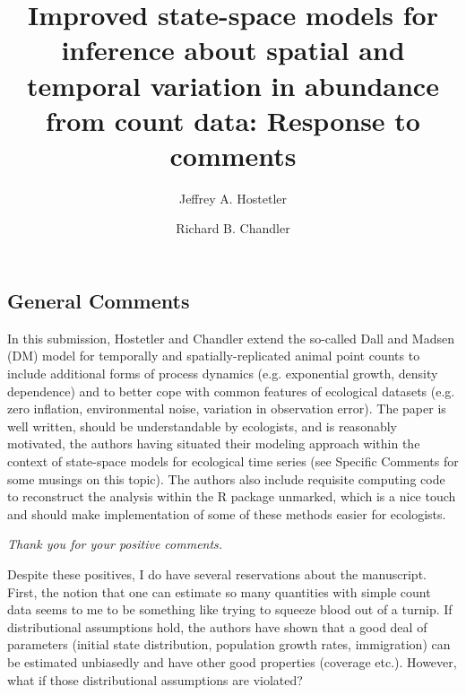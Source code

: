 \documentclass[12pt,english]{article}
\title{Improved state-space models for inference about 
spatial and temporal variation in abundance from count data: Response to comments}
\author{Jeffrey A. Hostetler%
   \and Richard B. Chandler%
}
\date{} %
\begin{document}
\maketitle
\vspace{-1cm}
\begin{spacing}{1.9}
\begin{flushleft}
\renewcommand*\thetable{R\arabic{table}}
\renewcommand*\thefigure{R\arabic{figure}}
\renewcommand*\theequation{R\arabic{equation}}

\section*{General Comments}
\label{sec:general}

In this submission, Hostetler and Chandler extend the so-called Dall and Madsen (DM) 
model for temporally and spatially-replicated animal point counts to include additional 
forms of process dynamics (e.g. exponential growth, density dependence) and to better 
cope with common features of ecological datasets (e.g. zero inflation, environmental noise, 
variation in observation error). The paper is well written, should be understandable by ecologists, 
and is reasonably motivated, the authors having situated their modeling approach within the 
context of state-space models for ecological time series (see Specific Comments for some 
musings on this topic). The authors also include requisite computing code to reconstruct the 
analysis within the R package unmarked, which is a nice touch and should make implementation 
of some of these methods easier for ecologists.

\vspace{0.5cm}
\textit{Thank you for your positive comments.}
\vspace{0.5cm}

Despite these positives, I do have several reservations about the manuscript. First, the notion that 
one can estimate so many quantities with simple count data seems to me to be something like trying 
to squeeze blood out of a turnip. If distributional assumptions hold, the authors have shown that a 
good deal of parameters (initial state distribution, population growth rates, immigration) can be 
estimated unbiasedly and have other good properties (coverage etc.). However, what if those 
distributional assumptions are violated?


\end{flushleft}
\end{spacing}
\end{document}
